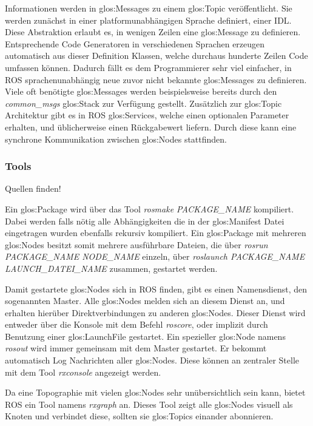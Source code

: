 Informationen werden in \glspl{glos:Message} zu einem \gls{glos:Topic} veröffentlicht. Sie werden zunächst in einer platformunabhängigen Sprache definiert, einer \gls{IDL}. Diese Abstraktion erlaubt es, in wenigen Zeilen eine \gls{glos:Message} zu definieren. Entsprechende Code Generatoren in verschiedenen Sprachen erzeugen automatisch aus dieser Definition Klassen, welche durchaus hunderte Zeilen Code umfassen können. Dadurch fällt es dem Programmierer sehr viel einfacher, in \gls{ROS} sprachenunabhängig neue zuvor nicht bekannte \glspl{glos:Message} zu definieren. Viele oft benötigte \glspl{glos:Message} werden beispielsweise bereits durch den \emph{common\_msgs} \gls{glos:Stack} zur Verfügung gestellt. Zusätzlich zur \gls{glos:Topic} Architektur gibt es in \gls{ROS} \glspl{glos:Service}, welche einen optionalen Parameter erhalten, und üblicherweise einen Rückgabewert liefern. Durch diese kann eine synchrone Kommunikation zwischen \glspl{glos:Node} stattfinden. 

\subsubsection{Tools}

{\color{red}Quellen finden!}

Ein \gls{glos:Package} wird über das Tool \emph{rosmake PACKAGE\_NAME} kompiliert. Dabei werden falls nötig alle Abhängigkeiten die in der \gls{glos:Manifest} Datei eingetragen wurden ebenfalls rekursiv kompiliert. Ein \gls{glos:Package} mit mehreren \glspl{glos:Node} besitzt somit mehrere ausführbare Dateien, die über \emph{rosrun PACKAGE\_NAME NODE\_NAME} einzeln, über \emph{roslaunch PACKAGE\_NAME LAUNCH\_DATEI\_NAME} zusammen, gestartet werden.

Damit gestartete \glspl{glos:Node} sich in \gls{ROS} finden, gibt es einen Namensdienst, den sogenannten Master. Alle \glspl{glos:Node} melden sich an diesem Dienst an, und erhalten hierüber Direktverbindungen zu anderen \glspl{glos:Node}. Dieser Dienst wird entweder über die Konsole mit dem Befehl \emph{roscore}, oder implizit durch Benutzung einer \gls{glos:LaunchFile} gestartet. Ein spezieller \gls{glos:Node} namens \emph{rosout} wird immer gemeinsam mit dem Master gestartet. Er bekommt automatisch Log Nachrichten aller \glspl{glos:Node}. Diese können an zentraler Stelle mit dem Tool \emph{rxconsole} angezeigt werden.

Da eine Topographie mit vielen \glspl{glos:Node} sehr unübersichtlich sein kann, bietet \gls{ROS} ein Tool namens \emph{rxgraph} an. Dieses Tool zeigt alle \glspl{glos:Node} visuell als Knoten und verbindet diese, sollten sie \glspl{glos:Topic} einander abonnieren.

